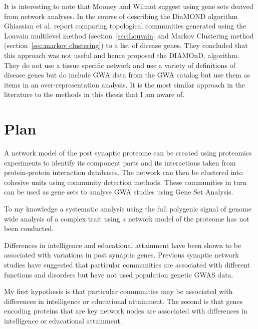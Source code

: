 It is interesting to note that Mooney and Wilmot \cite{mooney2015gene} suggest using gene sets derived from network analyses. In the course of describing the DiaMOND algorithm Ghiassian et al.\cite{ghiassian2015disease} report comparing topological communities generated using the Louvain multilevel method\cite{blondel2008fast} (section~\ref{sec:Louvain} and Markov Clustering method \cite{van2000graph} (section~\ref{sec:markov clustering}) to a list of disease genes. They concluded that this approach was not useful and hence proposed the DIAMOnD, algorithm. They do not use a tissue specific network and use a variety of definitions of disease genes but do include GWA data from the GWA catalog \cite{macarthur2017new} but use them as items in an over-representation analysis. It is the most similar approach in the literature to the methods in this thesis that I am aware of.



\section{Plan}
\label{sec:intro plan to procede to next chapter}

A network model of the post synaptic proteome can be created using proteomics experiments to identify its component parts and its interactions taken from protein-protein interaction databases. The network can then be clustered into cohesive units using community detection methods. These communities in turn can be used as gene sets to analyse GWA studies using Gene Set Analysis. 

To my knowledge a systematic analysis using the full polygenic signal of genome wide analysis of a complex trait using a network model of the proteome has not been conducted.

Differences in intelligence and educational attainment have been shown to be associated with variations in post synaptic genes. Previous synaptic network studies have suggested that particular communities are associated with different functions and disorders but have not used population genetic GWAS data. 

My first hypothesis is that particular communities may be associated with differences in intelligence or educational attainment. The second is that genes encoding proteins that are key network nodes are associated with differences in intelligence or educational attainment. 

